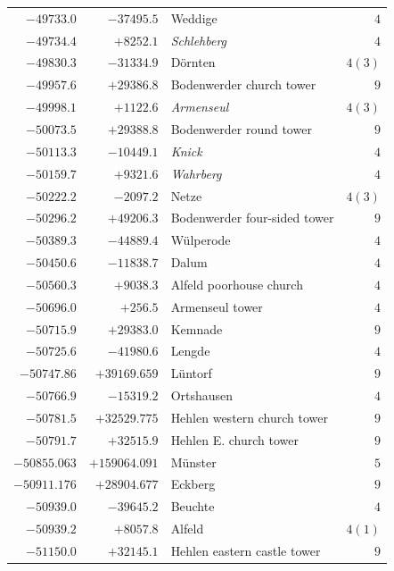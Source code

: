 \begin{center}
\begin{tabular}{r|r|p{170pt}|r}
\(-49733.0\)&\(-37495.5\)&Weddige&\(4\)\\
\(-49734.4\)&\(+8252.1\)&\textit{Schlehberg}&\(4\)\\
\(-49830.3\)&\(-31334.9\)&Dörnten&\(4 (3)\)\\
\(-49957.6\)&\(+29386.8\)&Bodenwerder church tower&\(9\)\\
\(-49998.1\)&\(+1122.6\)&\textit{Armenseul}&\(4 (3)\)\\
\(-50073.5\)&\(+29388.8\)&Bodenwerder round tower&\(9\)\\
\(-50113.3\)&\(-10449.1\)&\textit{Knick}&\(4\)\\
\(-50159.7\)&\(+9321.6\)&\textit{Wahrberg}&\(4\)\\
\(-50222.2\)&\(-2097.2\)&Netze&\(4 (3)\)\\
\(-50296.2\)&\(+49206.3\)&Bodenwerder four-sided tower&\(9\)\\
\(-50389.3\)&\(-44889.4\)&Wülperode&\(4\)\\
\(-50450.6\)&\(-11838.7\)&Dalum&\(4\)\\
\(-50560.3\)&\(+9038.3\)&Alfeld poorhouse church&\(4\)\\
\(-50696.0\)&\(+256.5\)&Armenseul tower&\(4\)\\
\(-50715.9\)&\(+29383.0\)&Kemnade&\(9\)\\
\(-50725.6\)&\(-41980.6\)&Lengde&\(4\)\\
\(-50747.86\)&\(+39169.659\)&Lüntorf&\(9\)\\
\(-50766.9\)&\(-15319.2\)&Ortshausen&\(4\)\\
\(-50781.5\)&\(+32529.775\)&Hehlen western church tower&\(9\)\\
\(-50791.7\)&\(+32515.9\)&Hehlen E. church tower&\(9\)\\
\(-50855.063\)&\(+159064.091\)&Münster&\(5\)\\
\(-50911.176\)&\(+28904.677\)&Eckberg&\(9\)\\
\(-50939.0\)&\(-39645.2\)&Beuchte&\(4\)\\
\(-50939.2\)&\(+8057.8\)&Alfeld&\(4 (1)\)\\
\(-51150.0\)&\(+32145.1\)&Hehlen eastern castle tower&\(9\)\\
\hline\end{tabular}\endgroup\end{center}
\clearpage
